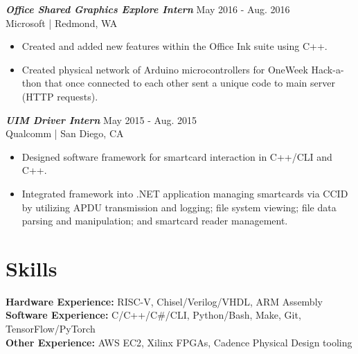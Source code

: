 \documentclass[letter]{res}
\begin{document}
\begin{resume}
{\sl \textbf{Office Shared Graphics Explore Intern}} \hfill May 2016 - Aug. 2016\\
Microsoft | Redmond, WA \newline
 \vspace{-4mm}
  \begin{itemize}
  \item Created and added new features within the Office Ink suite using C++.
  \item Created physical network of Arduino microcontrollers for OneWeek Hack-a-thon that once connected to each other sent a unique code to main server (HTTP requests).
  \end{itemize}

\vspace{-2mm}

{\sl \textbf{UIM Driver Intern}} \hfill May 2015 - Aug. 2015\\
Qualcomm | San Diego, CA \newline

 \vspace{-4mm}

 \begin{itemize}
 \item Designed software framework for smartcard interaction in C++/CLI and C++.
 \item Integrated framework into .NET application managing smartcards via CCID by utilizing APDU transmission and logging; file system viewing; file data parsing and manipulation; and smartcard reader management.
 \end{itemize}

\vspace{-4mm}

\section{Skills}
\textbf{Hardware Experience:} RISC-V, Chisel/Verilog/VHDL, ARM Assembly\\
\textbf{Software Experience:} C/C++/C\#/CLI, Python/Bash, Make, Git, TensorFlow/PyTorch\\
\textbf{Other Experience:} AWS EC2, Xilinx FPGAs, Cadence Physical Design tooling\\

\vspace{-8mm}


\end{resume}
\end{document}
